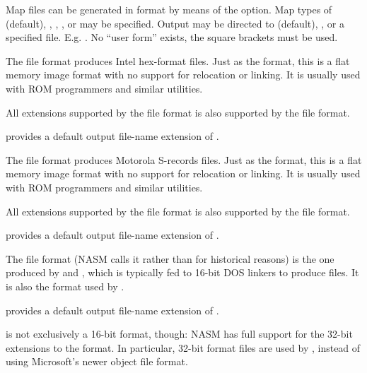 
Map files can be generated in  format by means of the \code{[map]}
option. Map types of  (default), , ,
, or  may be specified. Output may be directed
to  (default), , or a specified file. E.g.
. No ``user form'' exists, the square
brackets must be used.


The  file format produces Intel hex-format files. Just as the
 format, this is a flat memory image format with no support for
relocation or linking. It is usually used with ROM programmers and
similar utilities.

All extensions supported by the  file format is also supported by
the  file format.

 provides a default output file-name extension of .


The  file format produces Motorola S-records files. Just as the
 format, this is a flat memory image format with no support for
relocation or linking. It is usually used with ROM programmers and similar
utilities.

All extensions supported by the  file format is also supported by
the  file format.

 provides a default output file-name extension of .


The  file format (NASM calls it  rather than
 for historical reasons) is the one produced by 
and , which is typically fed to 16-bit DOS linkers
to produce  files. It is also the format used by
.

 provides a default output file-name extension of .

 is not exclusively a 16-bit format, though: NASM has full
support for the 32-bit extensions to the format. In particular,
32-bit  format files are used by , instead of using Microsoft's newer  object
file format.

